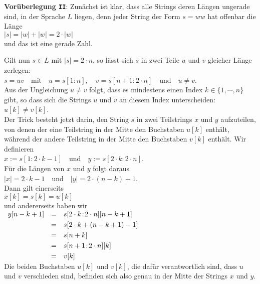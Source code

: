 \noindent
\textbf{Vor\"uberlegung \texttt{II}}:
Zun\"achst ist klar, dass alle Strings deren L\"angen ungerade sind, in der Sprache $L$ liegen,
denn jeder String der Form $s=ww$ hat offenbar die L\"ange 
\\[0.2cm]
\hspace*{1.3cm}
$|s| = |w| + |w| = 2\cdot |w|$
\\[0.2cm]
und das ist eine gerade Zahl.

Gilt nun $s \in L$ mit $|s| = 2 \cdot n$, so l\"asst sich $s$ in zwei Teile $u$ und $v$ gleicher
L\"ange zerlegen:
\\[0.2cm]
\hspace*{1.3cm}
$s = uv \quad \mbox{mit} \quad u = s[1\!:\!n], \quad v = s[n+1\!:\!2 \cdot n]
  \quad \mbox{und} \quad u \not= v
$.
\\[0.2cm]
Aus der Ungleichung $u \not= v$ folgt, dass es mindestens einen Index $k \in \{1,\cdots,n\}$ gibt,
so dass sich die Strings $u$ und $v$ an diesem Index unterscheiden:
\\[0.2cm]
\hspace*{1.3cm}
$u[k] \not= v[k]$. 
\\[0.2cm]
Der Trick besteht jetzt darin, den String $s$ in zwei Teilstrings $x$ und $y$ aufzuteilen,
von denen der eine 
Teilstring in der Mitte den Buchstaben $u[k]$ enth\"alt, w\"ahrend der andere Teilstring in der Mitte den
Buchstaben $v[k]$ enth\"alt.  Wir definieren
\\[0.2cm]
\hspace*{1.3cm}
$x := s[1\!:\!2 \cdot k - 1] \quad \mbox{und} \quad y := s[2 \cdot k\!:\! 2 \cdot n]$.
\\[0.2cm]
F\"ur die L\"angen von $x$ und $y$ folgt daraus
\\[0.2cm]
\hspace*{1.3cm}
$|x| = 2 \cdot k - 1 \quad \mbox{und} \quad |y| = 2 \cdot (n - k) + 1$. 
\\[0.2cm]
Dann gilt einerseits
\\[0.2cm]
\hspace*{1.3cm}
$x[k] = s[k] = u[k]$
\\[0.2cm]
und andererseits haben wir
\\[0.2cm]
\hspace*{1.3cm}
$
\begin{array}[t]{lcl}
    y[n - k + 1] & = & s[2 \cdot k\!:\! 2 \cdot n][n - k + 1] \\[0.1cm]
                 & = & s[2 \cdot k + (n - k + 1) - 1]     \\[0.1cm]
                 & = & s[n + k]                           \\[0.1cm]
                 & = & s[n+1\!:\! 2 \cdot n][k]               \\[0.1cm]
                 & = & v[k]               
\end{array}
$
\\[0.2cm]
Die beiden Buchstaben $u[k]$ und $v[k]$, die daf\"ur verantwortlich sind, dass $u$ und $v$ verschieden
sind, befinden sich also genau in der Mitte der Strings $x$ und $y$.
\vspace{0.3cm}

